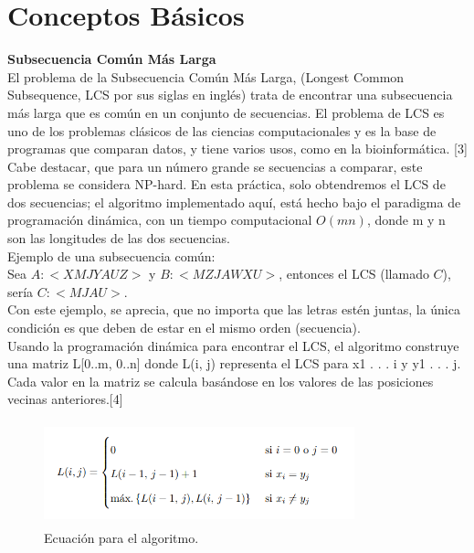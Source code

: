 \documentclass[12pt]{report}
\begin{document}
	
	\section{Conceptos Básicos}
	\textbf{Subsecuencia Común Más Larga}\\
		
El problema de la Subsecuencia Común Más Larga, (Longest Common Subsequence, LCS por sus siglas en inglés) trata de encontrar una subsecuencia más larga que es común en un conjunto de secuencias. El problema de LCS es uno de los problemas clásicos de las ciencias computacionales y es la base de programas que comparan datos, y tiene varios usos, como en la bioinformática. [3]\\
Cabe destacar, que para un número grande se secuencias a comparar, este problema se considera NP-hard. En esta práctica, solo obtendremos el LCS de dos secuencias;  el algoritmo implementado aquí, está hecho bajo el paradigma de programación dinámica, con un tiempo computacional $O(mn)$, donde m y n son las longitudes de las dos secuencias.\\

	
	Ejemplo de una subsecuencia común:\\
	
	Sea $A:<XMJYAUZ>$ y $B:<MZJAWXU>$, entonces el LCS (llamado $C$), sería $C:<MJAU>$.\\
	
	Con este ejemplo, se aprecia, que no importa que las letras estén juntas, la única condición es que deben de estar en el mismo orden (secuencia).\\
	
	Usando la programación dinámica para encontrar el LCS, el algoritmo construye una matriz L[0..m, 0..n] donde L(i, j) representa el LCS para x1 . . . i y y1 . . . j. Cada valor en la matriz se calcula basándose en los valores de las posiciones vecinas anteriores.[4]
		\begin{figure}[H]
			\includegraphics[height=3cm,width=9cm]{imagenes/1.png}
			\centering
			\caption{Ecuación para el algoritmo.}
			\centering
		\end{figure}
		\newpage
		
\end{document}
